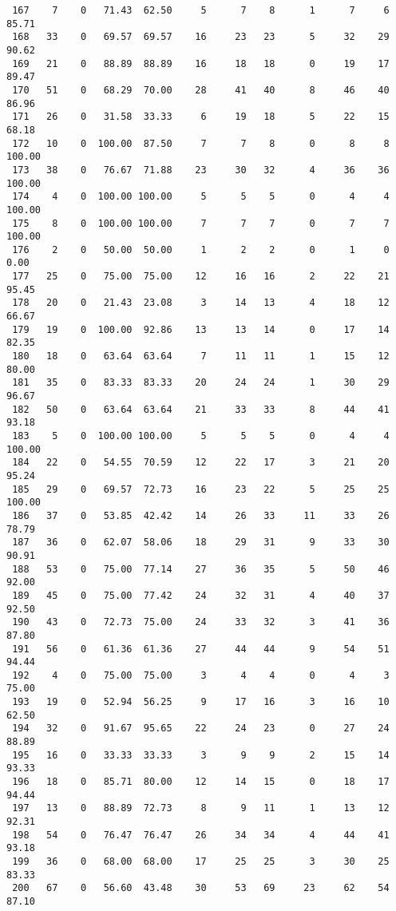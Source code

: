 \begin{verbatim}
 167    7    0   71.43  62.50     5      7    8      1      7     6    85.71
 168   33    0   69.57  69.57    16     23   23      5     32    29    90.62
 169   21    0   88.89  88.89    16     18   18      0     19    17    89.47
 170   51    0   68.29  70.00    28     41   40      8     46    40    86.96
 171   26    0   31.58  33.33     6     19   18      5     22    15    68.18
 172   10    0  100.00  87.50     7      7    8      0      8     8   100.00
 173   38    0   76.67  71.88    23     30   32      4     36    36   100.00
 174    4    0  100.00 100.00     5      5    5      0      4     4   100.00
 175    8    0  100.00 100.00     7      7    7      0      7     7   100.00
 176    2    0   50.00  50.00     1      2    2      0      1     0     0.00
 177   25    0   75.00  75.00    12     16   16      2     22    21    95.45
 178   20    0   21.43  23.08     3     14   13      4     18    12    66.67
 179   19    0  100.00  92.86    13     13   14      0     17    14    82.35
 180   18    0   63.64  63.64     7     11   11      1     15    12    80.00
 181   35    0   83.33  83.33    20     24   24      1     30    29    96.67
 182   50    0   63.64  63.64    21     33   33      8     44    41    93.18
 183    5    0  100.00 100.00     5      5    5      0      4     4   100.00
 184   22    0   54.55  70.59    12     22   17      3     21    20    95.24
 185   29    0   69.57  72.73    16     23   22      5     25    25   100.00
 186   37    0   53.85  42.42    14     26   33     11     33    26    78.79
 187   36    0   62.07  58.06    18     29   31      9     33    30    90.91
 188   53    0   75.00  77.14    27     36   35      5     50    46    92.00
 189   45    0   75.00  77.42    24     32   31      4     40    37    92.50
 190   43    0   72.73  75.00    24     33   32      3     41    36    87.80
 191   56    0   61.36  61.36    27     44   44      9     54    51    94.44
 192    4    0   75.00  75.00     3      4    4      0      4     3    75.00
 193   19    0   52.94  56.25     9     17   16      3     16    10    62.50
 194   32    0   91.67  95.65    22     24   23      0     27    24    88.89
 195   16    0   33.33  33.33     3      9    9      2     15    14    93.33
 196   18    0   85.71  80.00    12     14   15      0     18    17    94.44
 197   13    0   88.89  72.73     8      9   11      1     13    12    92.31
 198   54    0   76.47  76.47    26     34   34      4     44    41    93.18
 199   36    0   68.00  68.00    17     25   25      3     30    25    83.33
 200   67    0   56.60  43.48    30     53   69     23     62    54    87.10

\end{verbatim}

